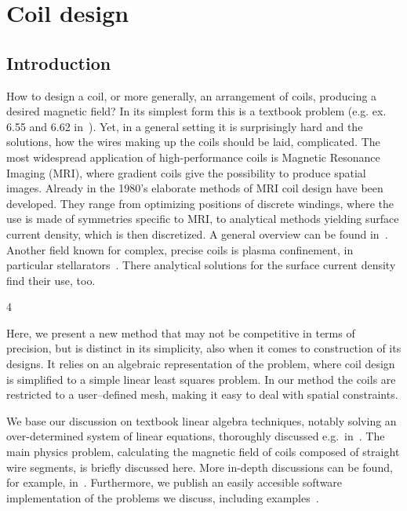 \chapter{Coil design} %
\label{ch:coil_design}

\section{Introduction}
How to design a coil, or more generally, an arrangement of coils, producing a desired magnetic field? In its simplest form this is a textbook problem (e.g. ex. 6.55 and 6.62 in~\cite{Purcell}). Yet, in a general setting it is surprisingly hard and the solutions, how the wires making up the coils should be laid, complicated. The most widespread application of high-performance coils is Magnetic Resonance Imaging (MRI), where gradient coils give the possibility to produce spatial images. Already in the 1980's elaborate methods of MRI coil design have been developed. They range from optimizing positions of discrete windings, where the use is made of symmetries specific to MRI, to analytical methods yielding surface current density, which is then discretized. A general overview can be found in~\cite{Turner1993}. Another field known for complex, precise coils is plasma confinement, in particular stellarators~\cite{Beidler1990}. There analytical solutions for the surface current density find their use, too.

4

Here, we present a new method that may not be competitive in terms of precision, but is distinct in its simplicity, also when it comes to construction of its designs. It relies on an algebraic representation of the problem, where coil design is simplified to a simple linear least squares problem. In our method the coils are restricted to a user--defined mesh, making it easy to deal with spatial constraints.

We base our discussion on textbook linear algebra techniques, notably solving an over-determined system of linear equations, thoroughly discussed e.g.\ in~\cite{Anton}. The main physics problem, calculating the magnetic field of coils composed of straight wire segments, is briefly discussed here. More in-depth discussions can be found, for example, in~\cite{Griffith}. Furthermore, we publish an easily accesible software implementation of the problems we discuss, including examples~\cite{Coilsjlcode}.

